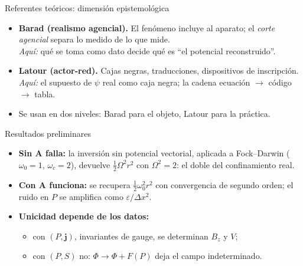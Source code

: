 \documentclass[aspectratio=169,10pt]{beamer}
\newcommand{\jv}{\mathbf{j}}
\newcommand{\Av}{\mathbf{A}}
\begin{document}
\begin{frame}{Referentes teóricos: dimensión epistemológica}
  \begin{itemize}
    \item \textbf{Barad (realismo agencial).} El fenómeno incluye al aparato; el \emph{corte agencial} separa lo medido de
          lo que mide.
          \\ \emph{Aquí:} qué se toma como dato decide qué es ``el potencial reconstruido''.
    \item \textbf{Latour (actor-red).} Cajas negras, traducciones, dispositivos de inscripción.
          \\ \emph{Aquí:} el supuesto de $\psi$ real como caja negra; la cadena ecuación $\to$ código $\to$ tabla.
    \item Se usan en dos niveles: Barad para el objeto, Latour para la práctica.
  \end{itemize}
\end{frame}

\begin{frame}{Resultados preliminares}
  \begin{itemize}
    \item \textbf{Sin $\Av$ falla:} la inversión sin potencial vectorial, aplicada a Fock--Darwin
          ($\omega_0=1$, $\omega_c=2$), devuelve $\tfrac12\Omega^2r^2$ con $\Omega^2=2$: el doble del confinamiento real.
    \item \textbf{Con $\Av$ funciona:} se recupera $\tfrac12\omega_0^2r^2$ con convergencia de segundo orden; el ruido en
          $P$ se amplifica como $\varepsilon/\Delta x^2$.
    \item \textbf{Unicidad depende de los datos:}
      \begin{itemize}
        \item con $(P,\jv)$, invariantes de gauge, se determinan $B_z$ y $V$;
        \item con $(P,S)$ no: $\Phi\to\Phi+F(P)$ deja el campo indeterminado.
      \end{itemize}
  \end{itemize}
\end{frame}
\end{document}
